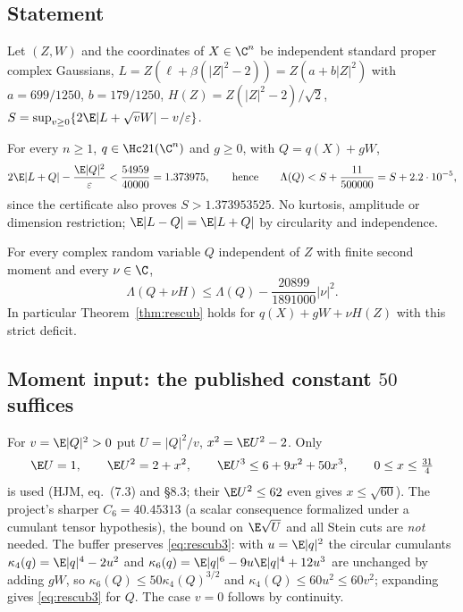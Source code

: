 \subsection{Statement}
Let $(Z,W)$ and the coordinates of $X\in\C^n$ be independent standard proper complex Gaussians, $L=Z(\ell+\beta(|Z|^2-2))=Z(a+b|Z|^2)$ with $a=699/1250$, $b=179/1250$, $H(Z)=Z(|Z|^2-2)/\sqrt2$,
$S=\sup_{v\ge0}\{2\E|L+\sqrt vW|-v/\varepsilon\}$.
\begin{theorem}\label{thm:rescub}
For every $n\ge1$, $q\in\Hc21(\C^n)$ and $g\ge0$, with $Q=q(X)+gW$,
\[
2\E|L+Q|-\frac{\E|Q|^2}\varepsilon<\frac{54959}{40000}=1.373975,\qquad\text{hence}\qquad\Lambda(Q)<S+\frac{11}{500000}=S+2.2\cdot10^{-5},
\]
since the certificate also proves $S>1.373953525$. No kurtosis, amplitude or dimension restriction; $\E|L-Q|=\E|L+Q|$ by circularity and independence.
\end{theorem}
\begin{theorem}\label{thm:rescub-diag}
For every complex random variable $Q$ independent of $Z$ with finite second moment and every $\nu\in\C$,
\[
\Lambda(Q+\nu H)\le\Lambda(Q)-\frac{20899}{1891000}|\nu|^2 .
\]
In particular Theorem~\ref{thm:rescub} holds for $q(X)+gW+\nu H(Z)$ with this strict deficit.
\end{theorem}

\subsection{Moment input: the published constant $50$ suffices}
For $v=\E|Q|^2>0$ put $U=|Q|^2/v$, $x^2=\E U^2-2$. Only
\begin{equation}\label{eq:rescub3}
\E U=1,\qquad\E U^2=2+x^2,\qquad\E U^3\le6+9x^2+50x^3,\qquad0\le x\le\tfrac{31}4
\end{equation}
is used (HJM, eq.~(7.3) and \S8.3; their $\E U^2\le62$ even gives $x\le\sqrt{60}$). The project's sharper $C_6=40.45313$ (a scalar consequence formalized under a cumulant tensor hypothesis), the bound on $\E\sqrt U$ and all Stein cuts are \emph{not} needed.
The buffer preserves \eqref{eq:rescub3}: with $u=\E|q|^2$ the circular cumulants $\kappa_4(q)=\E|q|^4-2u^2$ and $\kappa_6(q)=\E|q|^6-9u\E|q|^4+12u^3$ are unchanged by adding $gW$, so
$\kappa_6(Q)\le50\kappa_4(Q)^{3/2}$ and $\kappa_4(Q)\le60u^2\le60v^2$; expanding gives \eqref{eq:rescub3} for $Q$. The case $v=0$ follows by continuity.


